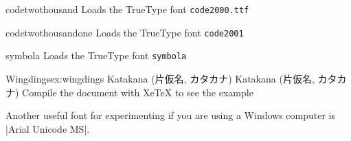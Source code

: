 
\begin{docCmd} {codetwothousand} {}
   Loads the TrueType font \texttt{code2000.ttf}
\end{docCmd} 

\begin{docCmd} {codetwothousandone} {}
   Loads the TrueType font \texttt{code2001}
\end{docCmd}

\begin{docCmd} {symbola} {}
  Loads the TrueType font \texttt{symbola}
\end{docCmd}

\begin{phdverbatim}
\end{phdverbatim}




\begin{texexample}{Wingdings}{ex:wingdings}
\ifxetex
   {\codetwothousand {} 
    Katakana (片仮名, カタカナ)
   \codetwothousandone {}
   \symbola {}
  }
\else
  \ifluatex
  {\codetwothousand {} 
    Katakana (片仮名, カタカナ)
   \codetwothousandone {}
   \symbola {}
  }
  \else
   Compile the document with XeTeX to see the example
  \fi 
\fi
\end{texexample}

Another useful font for experimenting if you are using a Windows computer is |Arial Unicode MS|.

%
%
%



